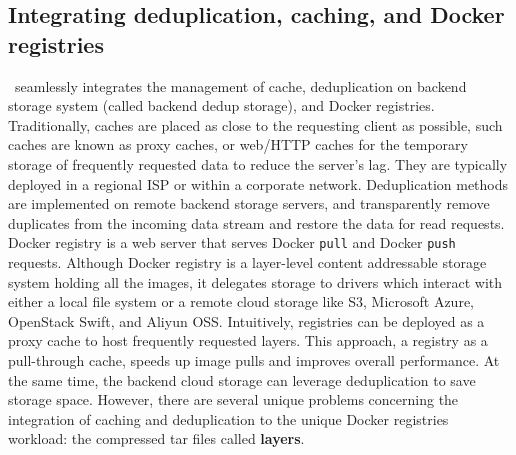 \subsection{Integrating deduplication, caching, and Docker registries}
\label{sec:design}

%

%
%
%

\sysname~seamlessly integrates the management of cache, deduplication on backend storage system (called backend dedup storage), and Docker registries.
Traditionally, caches are placed as close to the requesting client as possible, 
such caches are known as proxy caches, or web/HTTP caches for the temporary storage of 
frequently requested data to reduce the server's lag. 
They are typically deployed in a regional ISP or within a corporate network.
Deduplication methods are implemented on remote backend storage servers, and
transparently remove duplicates from the incoming data stream and restore the data for read requests. 
Docker registry is a web server that serves Docker \texttt{pull} and Docker \texttt{push} requests.
Although Docker registry is a layer-level content addressable storage system holding all the images,
it delegates storage to drivers which interact with either a local file system or a remote cloud storage like S3, Microsoft Azure, OpenStack Swift, and Aliyun OSS.
Intuitively, registries can be deployed as a proxy cache to host frequently requested layers. 
This approach, a registry as a pull-through cache, speeds up image pulls and improves overall performance.
At the same time, the backend cloud storage can leverage deduplication to save storage space.
However, there are several unique problems concerning the integration of caching and deduplication to the unique Docker registries workload: the compressed tar files called \textbf{layers}. 

